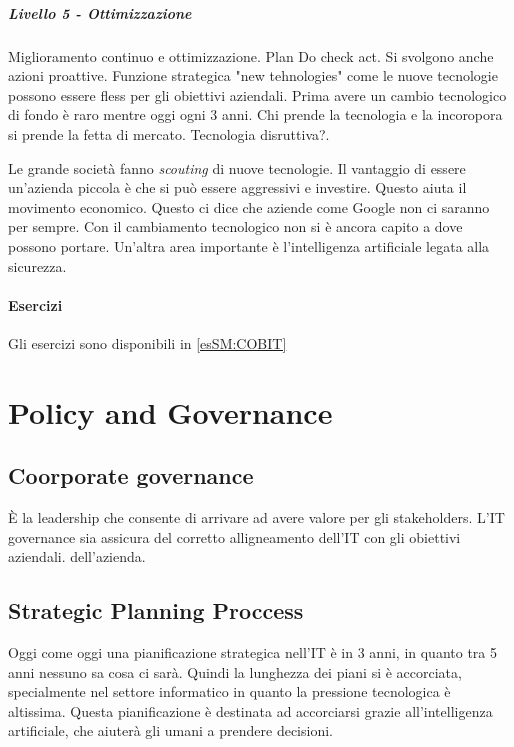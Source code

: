 \paragraph{Livello 5 - Ottimizzazione}

Miglioramento continuo e ottimizzazione. Plan Do check act.
Si svolgono anche azioni proattive. Funzione strategica "new tehnologies" come 
le nuove tecnologie possono essere fless per gli obiettivi aziendali. 
Prima avere un cambio tecnologico di fondo è raro mentre oggi ogni 3 anni. Chi 
prende la tecnologia e la incoropora si prende la fetta di mercato. Tecnologia 
disruttiva?.




Le grande società fanno \textit{scouting} di nuove tecnologie. Il vantaggio di 
essere un'azienda piccola è che si può essere aggressivi e investire. Questo 
aiuta il movimento economico. Questo ci dice che aziende come Google non ci 
saranno per sempre. Con il cambiamento tecnologico non si è ancora capito a dove 
possono portare. Un'altra area importante è l'intelligenza artificiale legata 
alla sicurezza.


\subsubsection{Esercizi}

Gli esercizi sono disponibili in \ref{esSM:COBIT}

\chapter{Policy and Governance}
\label{PG}

\section{Coorporate governance}

È la leadership che consente di arrivare ad avere valore per gli stakeholders.
L'IT governance sia assicura del corretto alligneamento dell'IT con gli 
obiettivi aziendali. dell'azienda.



\section{Strategic Planning Proccess}
\label{PG:SPP}

Oggi come oggi una pianificazione strategica nell'IT è in 3 anni, in quanto tra 
5 anni nessuno sa cosa ci sarà. Quindi la lunghezza dei piani si è accorciata, 
specialmente nel settore informatico in quanto la pressione tecnologica è 
altissima. Questa pianificazione è destinata ad accorciarsi grazie 
all'intelligenza artificiale, che aiuterà gli umani a prendere decisioni.
